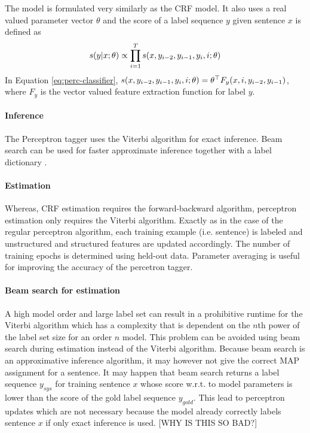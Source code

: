The model is formulated very similarly as the CRF model. It also uses
a real valued parameter vector $\theta$ and the score of a label
sequence $y$ given sentence $x$ is defined as
\begin{equation}s(y|x\mbox{$ ; \, $}\theta) \propto \prod_{i = 1}^T s(x,
  y_{i-2}, y_{i-1}, y_i, i\mbox{$ ; \, $}
  \theta)\label{eq:perc-classifier}\end{equation} In Equation
\ref{eq:perc-classifier}, $s(x, y_{i-2}, y_{i-1}, y_i, i\mbox{$ ; \, $}
\theta) = \theta^\top F_y(x, i, y_{i-2}, y_{i-1})$, where $F_y$ is the
vector valued feature extraction function for label $y$.

\paragraph{Inference} The Perceptron tagger uses the Viterbi algorithm
for exact inference. Beam search can be used for faster approximate
inference together with a label dictionary \citep{Silfverberg2015}.

\paragraph{Estimation}Whereas, CRF estimation requires the
forward-backward algorithm, perceptron estimation only requires the
Viterbi algorithm.  Exactly as in the case of the regular perceptron
algorithm, each training example (i.e. sentence) is labeled and
unstructured and structured features are updated accordingly. The
number of training epochs is determined using held-out data. Parameter
averaging is useful for improving the accuracy of the percetron
tagger.

\paragraph{Beam search for estimation} A high model order and large
label set can result in a prohibitive runtime for the Viterbi
algorithm which has a complexity that is dependent on the $n$th power
of the label set size for an order $n$ model. This problem can be
avoided using beam search during estimation instead of the Viterbi
algorithm. Because beam search is an approximative inference
algorithm, it may however not give the correct MAP assignment for a
sentence. It may happen that beam search returns a label sequence
$y_{sys}$ for training sentence $x$ whose score w.r.t. to model
parameters is lower than the score of the gold label sequence
$y_{gold}$. This lead to perceptron updates which are not necessary
because the model already correctly labels sentence $x$ if only exact
inference is used. [WHY IS THIS SO BAD?]


